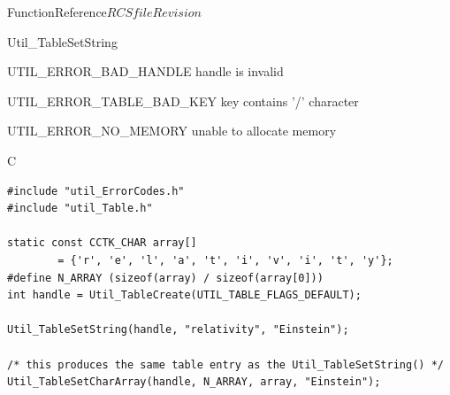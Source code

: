 \begin{cactuspart}{FunctionReference}{$RCSfile$}{$Revision$}
\begin{FunctionDescription}{Util\_TableSetString}
\begin{ErrorSection}
\begin{Error}{UTIL\_ERROR\_BAD\_HANDLE}
handle is invalid
\end{Error}
\begin{Error}{UTIL\_ERROR\_TABLE\_BAD\_KEY}
key contains '/' character
\end{Error}
\begin{Error}{UTIL\_ERROR\_NO\_MEMORY}
unable to allocate memory
\end{Error}
\end{ErrorSection}

\begin{ExampleSection}
\begin{Example}{C}
\begin{verbatim}
#include "util_ErrorCodes.h"
#include "util_Table.h"

static const CCTK_CHAR array[]
        = {'r', 'e', 'l', 'a', 't', 'i', 'v', 'i', 't', 'y'};
#define N_ARRAY (sizeof(array) / sizeof(array[0]))
int handle = Util_TableCreate(UTIL_TABLE_FLAGS_DEFAULT);

Util_TableSetString(handle, "relativity", "Einstein");

/* this produces the same table entry as the Util_TableSetString() */
Util_TableSetCharArray(handle, N_ARRAY, array, "Einstein");
\end{verbatim}
\end{Example}
\end{ExampleSection}
\end{FunctionDescription}


\end{cactuspart}
